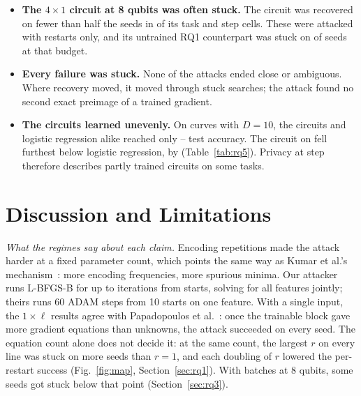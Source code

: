 \documentclass[10pt,conference]{IEEEtran}
\begin{document}
\begin{itemize}
  further tests, not a result. Frequency is also not the only difference: $D = 2$ is the task
  every circuit fit best, at test accuracy \TrainedLeadAccLow{} or more, above every circuit on the
  other tasks. A better fit, rather than the low frequency, may explain the drop.
  \item \textbf{The $4\times1$ circuit at 8 qubits was often stuck.} The \TrainedDeepCircuit{}
  circuit was recovered on fewer than half the seeds in \TrainedDeepBelowHalf{} of its
  \TrainedDeepCells{} task and step cells. These were attacked with \Restarts{} restarts only,
  and its untrained RQ1 counterpart was stuck on \StuckFourOneLarge{} of \Seeds{} seeds at that
  budget.
  \item \textbf{Every failure was stuck.} None of the \TrainedAttacks{} attacks ended close or
  ambiguous. Where recovery moved, it moved through stuck searches; the attack found no second
  exact preimage of a trained gradient.
  \item \textbf{The circuits learned unevenly.} On curves with $D = 10$, the circuits and logistic
  regression alike reached only \TrainedTenAccLow--\TrainedTenAccHigh{} test accuracy. The
  \TrainedWorstCircuit{} circuit on \TrainedWorstTask{} fell furthest below logistic regression,
  by \TrainedWorstGap{} (Table~\ref{tab:rq5}). Privacy at step \TrainedFinalStep{} therefore describes
  partly trained circuits on some tasks.
\end{itemize}

\section{Discussion and Limitations}
\emph{What the regimes say about each claim.} Encoding repetitions made the attack harder at a fixed
parameter count, which points the same way as Kumar et al.'s mechanism~\cite{kumar2023}: more
encoding frequencies, more spurious minima. Our attacker runs L-BFGS-B for up to \MaxIter{}
iterations from \Restarts{} starts, solving for all features jointly; theirs runs 60 ADAM steps
from 10 starts on one feature. With a single input, the $1\times\ell$ results agree with
Papadopoulos et al.~\cite{papadopoulos2025}: once the trainable block gave more gradient equations
than unknowns, the attack succeeded on every seed. The equation count alone does not decide it:
at the same count, the largest $r$ on every line was stuck on more seeds than $r = 1$, and each doubling of $r$
lowered the per-restart success (Fig.~\ref{fig:map}, Section~\ref{sec:rq1}). With
batches at 8 qubits, some seeds got stuck
below that point (Section~\ref{sec:rq3}).
\end{document}
